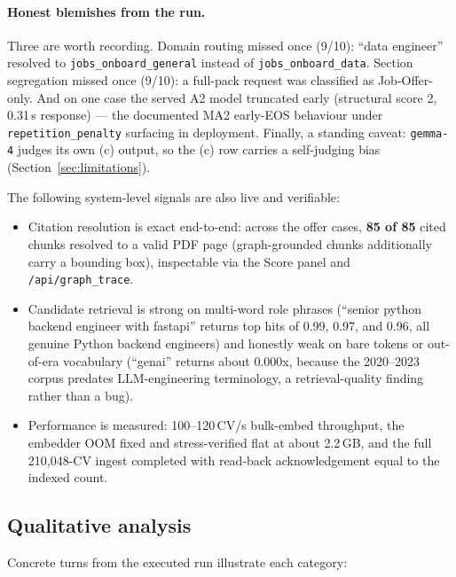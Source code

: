 \paragraph{Honest blemishes from the run.} Three are worth recording. Domain routing missed
once (9/10): ``data engineer'' resolved to \verb|jobs_onboard_general| instead of
\verb|jobs_onboard_data|. Section segregation missed once (9/10): a full-pack request was
classified as Job-Offer-only. And on one case the served A2 model truncated early (structural
score 2, 0.31\,s response) --- the documented MA2 early-EOS behaviour under
\verb|repetition_penalty| surfacing in deployment. Finally, a standing caveat: \verb|gemma-4|
judges its own (c) output, so the (c) row carries a self-judging bias (Section~\ref{sec:limitations}).

The following system-level signals are also live and verifiable:

\begin{itemize}
  \item Citation resolution is exact end-to-end: across the offer cases, \textbf{85 of 85}
    cited chunks resolved to a valid PDF page (graph-grounded chunks additionally carry a
    bounding box), inspectable via the Score panel and \verb|/api/graph_trace|.
  \item Candidate retrieval is strong on multi-word role phrases (``senior python backend
    engineer with fastapi'' returns top hits of 0.99, 0.97, and 0.96, all genuine Python
    backend engineers) and honestly weak on bare tokens or out-of-era vocabulary (``genai''
    returns about 0.000x, because the 2020--2023 corpus predates LLM-engineering
    terminology, a retrieval-quality finding rather than a bug).
  \item Performance is measured: 100--120\,CV/s bulk-embed throughput, the embedder OOM
    fixed and stress-verified flat at about 2.2\,GB, and the full 210,048-CV ingest
    completed with read-back acknowledgement equal to the indexed count.
\end{itemize}

\subsection{Qualitative analysis}

Concrete turns from the executed run illustrate each category:

